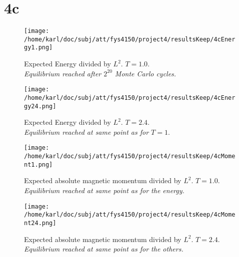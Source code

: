 \documentclass{article}
\begin{document}
\section{4c}

\begin{minipage}{.45\textwidth} 
	\begin{figure}[H]
		\centering
		\texttt{[image: /home/karl/doc/subj/att/fys4150/project4/resultsKeep/4cEnergy1.png]}
		\caption{Expected Energy divided by $L^2$. $T=1.0$. \\ \textit{Equilibrium reached after $2^{20}$ Monte Carlo cycles.}}
		\label{1}
	\end{figure}
\end{minipage}\hfill
\begin{minipage}{.45\textwidth} 
	\begin{figure}[H]
		\centering
		\texttt{[image: /home/karl/doc/subj/att/fys4150/project4/resultsKeep/4cEnergy24.png]}
		\caption{Expected Energy divided by $L^2$. $T = 2.4$. \\ \textit{Equilibrium reached at same point as for $T=1$}.}
		\label{1}
	\end{figure}
\end{minipage}\hfill
\vspace{2ex}

\begin{minipage}{.45\textwidth} 
	\begin{figure}[H]
		\centering
		\texttt{[image: /home/karl/doc/subj/att/fys4150/project4/resultsKeep/4cMoment1.png]}
		\caption{Expected absolute magnetic momentum divided by $L^2$. $T = 1.0$. \\ \textit{Equilibrium reached at same point as for the energy.}}
		\label{1}
	\end{figure}
\end{minipage}\hfill
\begin{minipage}{.45\textwidth} 
	\begin{figure}[H]
		\centering
		\texttt{[image: /home/karl/doc/subj/att/fys4150/project4/resultsKeep/4cMoment24.png]}
		\caption{Expected absolute magnetic momentum divided by $L^2$. $T = 2.4$. \\ \textit{Equilibrium reached at same point as for the others.}}
		\label{1}
	\end{figure}
\end{minipage}\hfill
\vspace{2ex}
\end{document}
